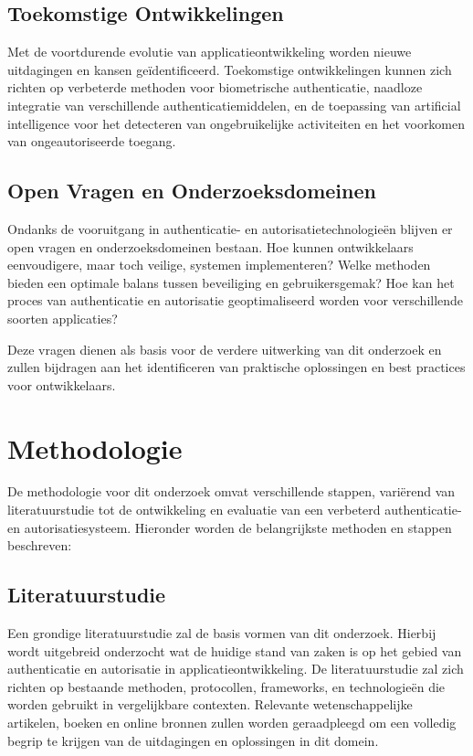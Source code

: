 \subsection{Toekomstige Ontwikkelingen}

Met de voortdurende evolutie van applicatieontwikkeling worden nieuwe uitdagingen en kansen geïdentificeerd. Toekomstige ontwikkelingen kunnen zich
richten op verbeterde methoden voor biometrische authenticatie, naadloze integratie van verschillende authenticatiemiddelen, en de toepassing van
artificial intelligence voor het detecteren van ongebruikelijke activiteiten en het voorkomen van ongeautoriseerde toegang.

\subsection{Open Vragen en Onderzoeksdomeinen}

Ondanks de vooruitgang in authenticatie- en autorisatietechnologieën blijven er open vragen en onderzoeksdomeinen bestaan. Hoe kunnen ontwikkelaars
eenvoudigere, maar toch veilige, systemen implementeren? Welke methoden bieden een optimale balans tussen beveiliging en gebruikersgemak? Hoe kan
het proces van authenticatie en autorisatie geoptimaliseerd worden voor verschillende soorten applicaties?

Deze vragen dienen als basis voor de verdere uitwerking van dit onderzoek en zullen bijdragen aan het identificeren van praktische oplossingen en
best practices voor ontwikkelaars.

\section{Methodologie}%
\label{sec:methodologie}

De methodologie voor dit onderzoek omvat verschillende stappen, variërend van literatuurstudie tot de ontwikkeling en evaluatie van een verbeterd 
authenticatie- en autorisatiesysteem. Hieronder worden de belangrijkste methoden en stappen beschreven:

\subsection{Literatuurstudie}

Een grondige literatuurstudie zal de basis vormen van dit onderzoek. Hierbij wordt uitgebreid onderzocht wat de huidige stand van zaken is op het 
gebied van authenticatie en autorisatie in applicatieontwikkeling. De literatuurstudie zal zich richten op bestaande methoden, protocollen, frameworks, 
en technologieën die worden gebruikt in vergelijkbare contexten. Relevante wetenschappelijke artikelen, boeken en online bronnen zullen worden 
geraadpleegd om een volledig begrip te krijgen van de uitdagingen en oplossingen in dit domein.

